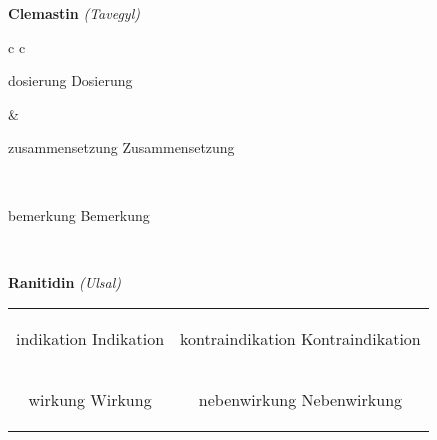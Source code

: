 \documentclass[12pt]{beamer}
\begin{document}
\begin{frame}{
    \textbf{Clemastin}
    \textit{(Tavegyl)}
}
    \begin{tabular}{c c}
        \begin{beamercolorbox}[wd=\boxwidth\textwidth,ht=\boxheight\textheight,sep=1em]{dosierung}
        Dosierung
        \end{beamercolorbox} & 
        \begin{beamercolorbox}[wd=\boxwidth\textwidth,ht=\boxheight\textheight,sep=1em]{zusammensetzung}
        Zusammensetzung
        \end{beamercolorbox} \\
        \begin{beamercolorbox}[wd=\textwidth,ht=\boxheight\textheight,sep=1em]{bemerkung}
        Bemerkung
        \end{beamercolorbox} \\
    \end{tabular}
\end{frame}

\begin{frame}{
    \textbf{Ranitidin}
    \textit{(Ulsal)}
}
    \begin{tabular}{c c}
        \begin{beamercolorbox}[wd=\boxwidth\textwidth,ht=\boxheight\textheight,sep=1em]{indikation}
        Indikation
        \end{beamercolorbox} & 
        \begin{beamercolorbox}[wd=\boxwidth\textwidth,ht=\boxheight\textheight,sep=1em]{kontraindikation}
        Kontraindikation 
        \end{beamercolorbox} \\
        \begin{beamercolorbox}[wd=\boxwidth\textwidth,ht=\boxheight\textheight,sep=1em]{wirkung}
        Wirkung
        \end{beamercolorbox} & 
        \begin{beamercolorbox}[wd=\boxwidth\textwidth,ht=\boxheight\textheight,sep=1em]{nebenwirkung}
        Nebenwirkung
        \end{beamercolorbox} \\
    \end{tabular}
\end{frame}
\end{document}
